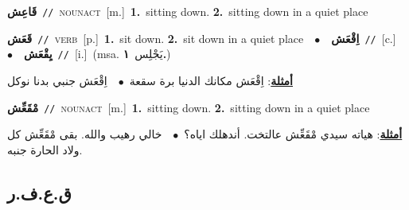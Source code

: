 \documentclass[10pt,a4paper,twoside]{article} %
\begin{document}
\begin{multicols}{2}
{\setlength\topsep{0pt}\textbf{\foreignlanguage{arabic}{قَاعِش}}\ {\color{gray}\texttt{//}\color{black}}\ \textsc{noun\textunderscore act}\ [m.]\ \textbf{1.}~sitting down.  \textbf{2.}~sitting down in a quiet place\ } \vspace{2mm}

{\setlength\topsep{0pt}\textbf{\foreignlanguage{arabic}{قَعَش}}\ {\color{gray}\texttt{//}\color{black}}\ \textsc{verb}\ [p.]\ \textbf{1.}~sit down.  \textbf{2.}~sit down in a quiet place\ \ $\bullet$\ \ \setlength\topsep{0pt}\textbf{\foreignlanguage{arabic}{اِقْعَش}}\ {\color{gray}\texttt{//}\color{black}}\ [c.]\ \ $\bullet$\ \ \setlength\topsep{0pt}\textbf{\foreignlanguage{arabic}{يِقْعَش}}\ {\color{gray}\texttt{//}\color{black}}\ [i.]\ \color{gray}(msa. \foreignlanguage{arabic}{يَجْلِس}~\foreignlanguage{arabic}{\textbf{١.}})\color{black}\  \begin{flushright}\color{gray}\foreignlanguage{arabic}{\textbf{\underline{\foreignlanguage{arabic}{أمثلة}}}: اِقْعَش مكانك الدنيا برة سقعة\ $\bullet$\ \  اِقْعَش جنبي بدنا نوكل}\end{flushright}\color{black}} \vspace{2mm}

{\setlength\topsep{0pt}\textbf{\foreignlanguage{arabic}{مْقَعِّش}}\ {\color{gray}\texttt{//}\color{black}}\ \textsc{noun\textunderscore act}\ [m.]\ \textbf{1.}~sitting down.  \textbf{2.}~sitting down in a quiet place\  \begin{flushright}\color{gray}\foreignlanguage{arabic}{\textbf{\underline{\foreignlanguage{arabic}{أمثلة}}}: هياته سيدي مْقَعِّش عالتخت. أندهلك اياه؟\ $\bullet$\ \  خالي رهيب والله. بقى مْقَعِّش كل ولاد الحارة جنبه.}\end{flushright}\color{black}} \vspace{2mm}

\vspace{-3mm}
\subsection*{\color{blue}\foreignlanguage{arabic}{ق.ع.ف.ر}\color{blue}{}} 


\end{multicols}
\end{document}
